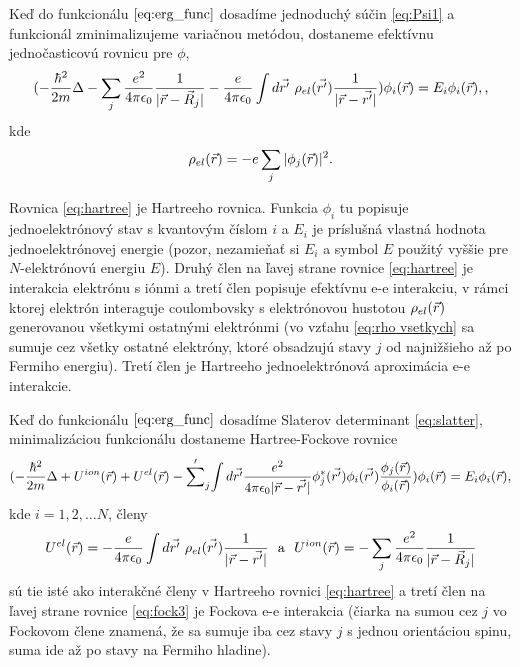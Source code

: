 Keď do funkcionálu $\eqref{eq:erg_func}$ dosadíme jednoduchý súčin \eqref{eq:Psi1} a funkcionál zminimalizujeme variačnou metódou,
dostaneme efektívnu jednočasticovú rovnicu pre $\phi$,
\begin{equation}
\label{eq:hartree}
(-\frac{\hbar^2}{2m}\Delta -\sum_j\frac{e^2}{4\pi \epsilon_0}{\frac{1}{|\vec{r}-\vec{R}_j|}} -\frac{e}{4\pi \epsilon_0} \int d\vec{r'}\ \rho_{el}(\vec{r'}) \frac {1}{|\vec{r}-\vec{r'}|})\phi_i({\vec{r}})=E_i\phi_i(\vec{r}), \text{,}
\end{equation}
kde
\begin{equation}
\label{eq:rho vsetkych}
\rho_{el}(\vec{r})=-e \sum_j |\phi_j(\vec{r})|^2 \text{.}
\end{equation}

Rovnica \eqref{eq:hartree} je Hartreeho rovnica. Funkcia $\phi_i$ tu popisuje jednoelektrónový stav s kvantovým číslom $i$ a $E_i$ je príslušná vlastná hodnota jednoelektrónovej energie (pozor, nezamieňať si $E_i$ a symbol $E$ použitý vyššie pre $N$-elektrónovú energiu $E$).
Druhý člen na ľavej strane rovnice \eqref{eq:hartree} je interakcia elektrónu s iónmi a tretí člen popisuje efektívnu e-e interakciu, v rámci ktorej elektrón interaguje coulombovsky s elektrónovou hustotou $\rho_{el}(\vec{r})$ generovanou
všetkymi ostatnými elektrónmi (vo vzťahu \eqref{eq:rho vsetkych} sa sumuje cez všetky ostatné elektróny, ktoré obsadzujú stavy $j$ od najnižšieho až po Fermiho energiu). Tretí člen je Hartreeho jednoelektrónová aproximácia e-e interakcie.

Keď do funkcionálu $\eqref{eq:erg_func}$ dosadíme Slaterov determinant \eqref{eq:slatter}, minimalizáciou funkcionálu dostaneme
Hartree-Fockove rovnice
\begin{equation}
\label{eq:fock3}
(-\frac{\hbar^2}{2m}\Delta +U^{ion}(\vec{r})+U^{el}(\vec{r})-
{\sum'}_j{\int d\vec{r'}\frac{e^2}{4\pi \epsilon_0|\vec{r}-\vec{r'}|}
\phi_j^{*}(\vec{r'})\phi_i(\vec{r'})\frac{\phi_j(\vec{r})}{\phi_i(\vec{r})}})\phi_i({\vec{r}})=E_i\phi_i(\vec{r}) \text{,}
\end{equation}
kde $i = 1, 2, \dots N$, členy
\begin{equation}
\label{eq:hartree a ion}
U^{el}(\vec{r}) = -\frac{e}{4\pi \epsilon_0} \int d\vec{r'}\ \rho_{el}(\vec{r'}) \frac {1}{|\vec{r}-\vec{r'}|} \ \  \text{a} \ \  U^{ion}(\vec{r}) = -\sum_j\frac{e^2}{4\pi \epsilon_0}{\frac{1}{|\vec{r}-\vec{R}_j|}}
\end{equation}
sú tie isté ako interakčné členy v Hartreeho rovnici \eqref{eq:hartree} a tretí člen na ľavej strane rovnice \eqref{eq:fock3}
je Fockova e-e interakcia (čiarka na sumou cez $j$ vo Fockovom člene znamená, že sa sumuje iba cez stavy $j$ s jednou orientáciou spinu, suma ide až po stavy na Fermiho hladine).

